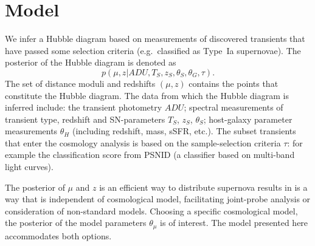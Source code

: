 \documentclass[preprint,3p]{elsarticle}
\begin{document}
\section{Model}
We infer a Hubble diagram based on measurements of discovered transients
that have passed some selection criteria (e.g.\ classified as Type~Ia supernovae).  The posterior
of the Hubble diagram is denoted as
\begin{equation}
p({\mu},{z} |  {{ADU}}, {{T}}_S,{{z}}_S,
{{\theta}}_S, \theta_G, \tau).
\label{hd:eqn}
\end{equation}
The set of distance moduli
and redshifts $(\mu, z)$ contains the points that constitute the Hubble diagram.  The
data
from which the Hubble diagram is inferred include:
the transient photometry ${ADU}$; spectral measurements of
transient
type, redshift and SN-parameters ${T}_S$, ${z}_S$, ${\theta}_S$;
host-galaxy parameter measurements $\theta_H$ (including redshift,
mass, sSFR, etc.).  
The subset transients that enter the cosmology
analysis is based on the sample-selection criteria $\tau$: for example
the classification score from PSNID (a classifier based on multi-band
light curves).

The posterior of $\mu$ and $z$ is an efficient way
to distribute supernova results in is a way that is independent of cosmological model,
facilitating joint-probe analysis or consideration of non-standard models.  Choosing
a specific cosmological model, the posterior of the model parameters $\theta_\mu$
is of interest.  The model presented here accommodates both options.
\end{document}
